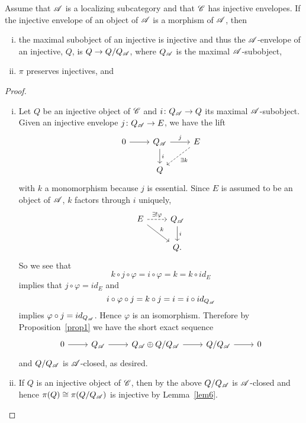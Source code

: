 \documentclass[10pt]{amsart}
\begin{document}
\begin{cor}\label{cor2}
  Assume that $\mathscr{A}$ is a localizing subcategory and that $\mathscr{C}$ has injective envelopes.
  If the injective envelope of an object of $\mathscr{A}$ is a morphism of $\mathscr{A}$, then
  \begin{enumerate}[(i)]
  \item\label{cor2.1}
    the maximal subobject of an injective is injective and thus the $\mathscr{A}$-envelope of an injective, $Q$, is $Q \rightarrow Q/Q_{\mathscr{A}}$, where $Q_{\mathscr{A}}$ is the maximal $\mathscr{A}$-subobject, 
  \item\label{cor2.2}
    $\pi$ preserves injectives, and
  \end{enumerate}
  \begin{proof}
    \begin{enumerate}[(i)]
    \item
      Let $Q$ be an injective object of $\mathscr{C}$ and $i \colon Q_{\mathscr{A}} \rightarrow Q$ its maximal $\mathscr{A}$-subobject.
      Given an injective envelope $j \colon Q_{\mathscr{A}} \rightarrow E$, we have the lift
      $$\begin{tikzcd}
        0 \arrow{r} & Q_\A \arrow{d}{i} \arrow{r}{j} & E \arrow[dashed]{ld}{\exists k}\\
        & Q
      \end{tikzcd}$$
      with $k$ a monomorphism because $j$ is essential.
      Since $E$ is assumed to be an object of $\mathscr{A}$, $k$ factors through $i$ uniquely,
      $$\begin{tikzcd}
        E \arrow{rd}{k}\arrow[dashed]{r}{\exists !\varphi} & Q_\A\arrow{d}{i}\\
        & Q.
      \end{tikzcd}$$
      So we see that
      $$k \circ j \circ \varphi = i \circ \varphi = k = k \circ id_E$$
      implies that  $j \circ \varphi = id_E$
      and
      $$i \circ \varphi \circ j = k \circ j = i = i \circ id_{Q_{\mathscr{A}}}$$
      implies $\varphi \circ j = id_{Q_{\mathscr{A}}}$.
      Hence $\varphi$ is an isomorphism.
      Therefore by Proposition~\ref{prop1} we have the short exact sequence
      $$\begin{tikzcd}
        0 \arrow{r} & Q_\A \arrow{r} & Q_\A \oplus Q/Q_\A \arrow{r} & Q/Q_\A \arrow{r} & 0
      \end{tikzcd}$$
      and $Q/Q_{\mathscr{A}}$ is $\mathscr{A}$-closed, as desired.
    \item
      If $Q$ is an injective object of $\mathscr{C}$, then by the above $Q/Q_{\mathscr{A}}$ is $\mathscr{A}$-closed and hence $\pi(Q) \cong \pi(Q/Q_{\mathscr{A}})$ is injective by Lemma~\ref{lem6}.
      

\end{enumerate}
\end{proof}
\end{cor}
\end{document}
